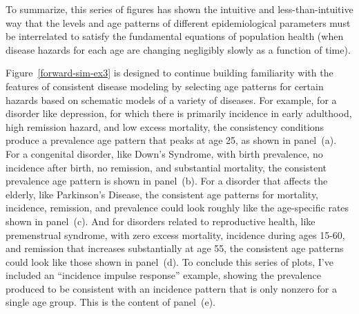 To summarize, this series of figures has shown the intuitive and
less-than-intuitive way that the levels and age patterns of different
epidemiological parameters must be interrelated to satisfy the
fundamental equations of population health (when disease hazards for
each age are changing negligibly slowly as a function of time).

Figure~\ref{forward-sim-ex3} is designed to continue building familiarity with the
features of consistent disease modeling by selecting age patterns for
certain hazards based on schematic models of a variety of diseases.  For
example, for a disorder like depression, for which there is primarily
incidence in early adulthood, high remission hazard, and low excess
mortality, the consistency conditions produce a prevalence age pattern
that peaks at age 25, as shown in panel~(a).
For a congenital disorder, like Down's Syndrome, with birth
prevalence, no incidence after birth, no remission, and substantial
mortality, the consistent prevalence age pattern is shown in
panel~(b).
For a disorder that affects the elderly, like Parkinson's Disease, the
consistent age patterns for mortality, incidence, remission, and
prevalence could look roughly like the age-specific rates shown in
panel~(c).
And for disorders related to reproductive health, like premenstrual
syndrome, with zero excess mortality, incidence during ages 15-60, and
remission that increases substantially at age 55, the consistent age
patterns could look like those shown in
panel~(d).
To conclude this series of plots, I've included an ``incidence impulse
response'' example, showing the prevalence produced to be consistent
with an incidence pattern that is only nonzero for a single age
group. This is the content of
panel~(e).


